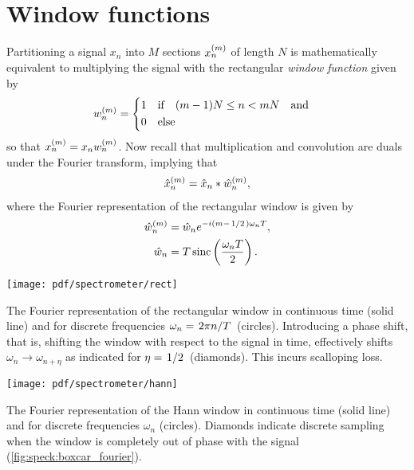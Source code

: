 \section{Window functions}\label{sec:speck:theory:windows}
Partitioning a signal $x_n$ into $M$ sections $x_n^{(m)}$ of length $N$ is mathematically equivalent to multiplying the signal with the rectangular \emph{window function} given by
\begin{align}\label{eq:speck:window:boxcar}
    w_n\gth{m} =
    \begin{dcases}
        1 &\qif* (m - 1) N \leq n < m N\qand \\
        0 &\qelse*
    \end{dcases}
\end{align}
so that $x_n^{(m)} = x_n w_n^{(m)}$.
Now recall that multiplication and convolution are duals under the Fourier transform, implying that
\begin{align}\label{eq:speck:window:ft_pairs}
    \hat{x}_n^{(m)} = \hat{x}_n \ast \hat{w}_n^{(m)},
\end{align}
where the Fourier representation of the rectangular window is given by
\begin{align}
    \hat{w}_n\gth{m} &= \hat{w}_n \e^{-\i(m - \flatfrac{1}{2})\omega_n T}, \label{eq:speck:window:boxcar:fourier}\\
             \hat{w}_n &= T\sinc\left(\frac{\omega_n T}{2}\right). \label{eq:speck:window:boxcar:fourier:unshifted}
\end{align}
\begin{marginfigure}
    \centering
    \texttt{[image: pdf/spectrometer/rect]}
    \caption{
        The Fourier representation of the rectangular window in continuous time (solid line) and for discrete frequencies $\omega_n = \flatfrac{2\pi n}{T}$ (circles).
        Introducing a phase shift, that is, shifting the window with respect to the signal in time, effectively shifts $\omega_n \to \omega_{n+\eta}$ as indicated for $\eta=\flatfrac{1}{2}$ (diamonds).
        This incurs scalloping loss.
    }
    \label{fig:speck:boxcar_fourier}
\end{marginfigure}
\begin{marginfigure}
    \centering
    \texttt{[image: pdf/spectrometer/hann]}
    \caption{
        The Fourier representation of the Hann window in continuous time (solid line) and for discrete frequencies $\omega_n$ (circles).
        Diamonds indicate discrete sampling when the window is completely out of phase with the signal (\cf \cref{fig:speck:boxcar_fourier}).
    }
    \label{fig:speck:hann_fourier}
\end{marginfigure}
